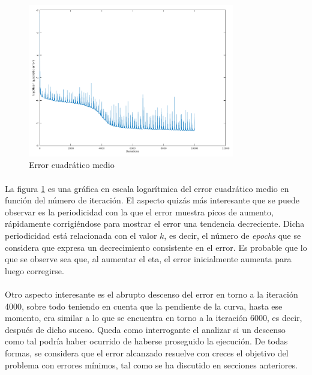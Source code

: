 \documentclass[12pt, twocolumn]{article}
\begin{document}
	\begin{figure}[H]
		\centering
		\includegraphics[width=9cm]{../results/adaptive_eta_incremental/3/log_incremental.png}
		\caption{Error cuadrático medio}
		\label{error1}
	\end{figure}
	
	\paragraph{} La figura \ref{error1} es una gráfica en escala logarítmica del error cuadrático medio en función del número de iteración. El aspecto quizás más interesante que se puede observar es la periodicidad con la que el error muestra picos de aumento, rápidamente corrigiéndose para mostrar el error una tendencia decreciente. Dicha periodicidad está relacionada con el valor $k$, es decir, el número de \textit{epochs} que se considera que expresa un decrecimiento consistente en el error. Es probable que lo que se observe sea que, al aumentar el eta, el error inicialmente aumenta para luego corregirse.
	
	\paragraph{} Otro aspecto interesante es el abrupto descenso del error en torno a la iteración 4000, sobre todo teniendo en cuenta que la pendiente de la curva, hasta ese momento, era similar a lo que se encuentra en torno a la iteración 6000, es decir, después de dicho suceso. Queda como interrogante el analizar si un descenso como tal podría haber ocurrido de haberse proseguido la ejecución. De todas formas, se considera que el error alcanzado resuelve con creces el objetivo del problema con errores mínimos, tal como se ha discutido en secciones anteriores. 

	

	
	
	
	
	
	
	
	
\end{document}
